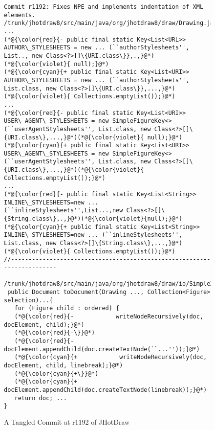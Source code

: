 \begin{figure}[t]
	\centering
	\begin{lstlisting}[]
Commit r1192: Fixes NPE and implements indentation of XML elements.
/trunk/jhotdraw8/src/main/java/org/jhotdraw8/draw/Drawing.java
...
(*@{\color{red}{- public final static Key<List<URL>> AUTHOR\_STYLESHEETS = new ... (``authorStylesheets'', List.., new Class<?>[]\{URI.class\}},.,}@*)(*@{\color{violet}{ null);}@*)
(*@{\color{cyan}{+ public final static Key<List<URI>> AUTHOR\_STYLESHEETS = new ... (``authorStylesheets'', List.class, new Class<?>[]\{URI.class\}},...,}@*)(*@{\color{violet}{ Collections.emptyList());}@*)
...
(*@{\color{red}{- public final static Key<List<URI>> USER\_AGENT\_STYLESHEETS = new SimpleFigureKey<>(``userAgentStylesheets'', List.class, new Class<?>[]\{URI.class\},...,}@*)(*@{\color{violet}{ null);}@*)
(*@{\color{cyan}{+ public final static Key<List<URI>> USER\_AGENT\_STYLESHEETS = new SimpleFigureKey<> (``userAgentStylesheets'', List.class, new Class<?>[]\{URI.class\},...,}@*)(*@{\color{violet}{ Collections.emptyList());}@*)
...
(*@{\color{red}{- public final static Key<List<String>> INLINE\_STYLESHEETS=new ... (``inlineStylesheets'',List...,new Class<?>[]\{String.class\},.,}@*)(*@{\color{violet}{null);}@*)
(*@{\color{cyan}{+ public final static Key<List<String>> INLINE\_STYLESHEETS=new ... (``inlineStylesheets'', List.class, new Class<?>[]\{String.class\},...,}@*)(*@{\color{violet}{ Collections.emptyList());}@*)
//------------------------------------------------------------------------
 /trunk/jhotdraw8/src/main/java/org/jhotdraw8/draw/io/SimpleXmlIO.java
 public Document toDocument(Drawing ..., Collection<Figure> selection)...{
   for (Figure child : ordered) {
   (*@{\color{red}{-            writeNodeRecursively(doc, docElement, child);}@*)
   (*@{\color{red}{-\}}@*)
   (*@{\color{red}{-          docElement.appendChild(doc.createTextNode(``...''));}@*)
   (*@{\color{cyan}{+            writeNodeRecursively(doc, docElement, child, linebreak);}@*)
   (*@{\color{cyan}{+\}}@*)
   (*@{\color{cyan}{+          docElement.appendChild(doc.createTextNode(linebreak));}@*)
   return doc; ...
}          
	\end{lstlisting}
        \vspace{-15pt}
        \caption{A Tangled Commit at r1192 of JHotDraw}
        \label{fig:motiv-cc}
\end{figure}



